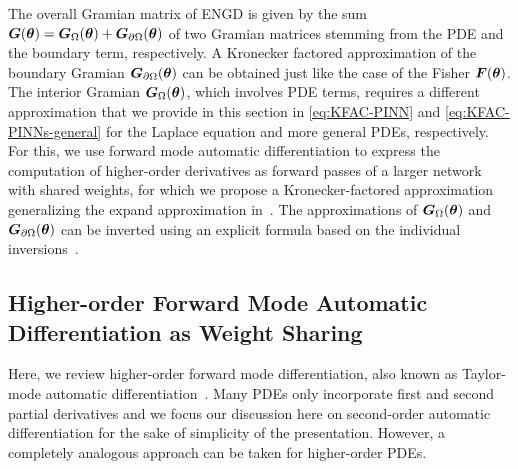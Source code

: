 
The overall Gramian matrix of ENGD is given by the sum ${\bm{G}}({\bm{\theta}})= {\bm{G}}_\Omega({\bm{\theta}}) + {\bm{G}}_{\partial\Omega}({\bm{\theta}})$ of two Gramian matrices stemming from the PDE and the boundary term, respectively.
A Kronecker factored approximation of the boundary Gramian ${\bm{G}}_{\partial\Omega}({\bm{\theta}})$ can be obtained just like the case of the  Fisher ${\bm{F}}({\bm{\theta}})$.
The interior Gramian ${\bm{G}}_\Omega({\bm{\theta}})$, which involves PDE terms, requires a different approximation that we provide in this section in \eqref{eq:KFAC-PINN} and \eqref{eq:KFAC-PINNs-general} for the Laplace equation and more general PDEs, respectively.
For this, we use forward mode automatic differentiation to express the computation of higher-order derivatives as forward passes of a larger network with shared weights, for which we propose a Kronecker-factored approximation generalizing the expand approximation in~\citet{eschenhagen2023kroneckerfactored}.
The approximations of ${\bm{G}}_{\Omega}({\bm{\theta}})$ and ${\bm{G}}_{\partial\Omega}({\bm{\theta}})$ can be %
inverted using an explicit formula based on the individual inversions~\citep{martens2015optimizing}.

\subsection{Higher-order Forward Mode Automatic Differentiation as Weight Sharing}
\label{sec:taylor-mode-AD}

Here, we review higher-order forward mode differentiation, also known as {Taylor-mode automatic differentiation}~\citep{griewank1996algorithm, griewank2008evaluating, bettencourt2019taylor}.
Many PDEs only incorporate first and second partial derivatives and we focus our discussion here on second-order automatic differentiation for the sake of simplicity of the presentation.
However, a completely analogous approach can be taken for higher-order PDEs.

